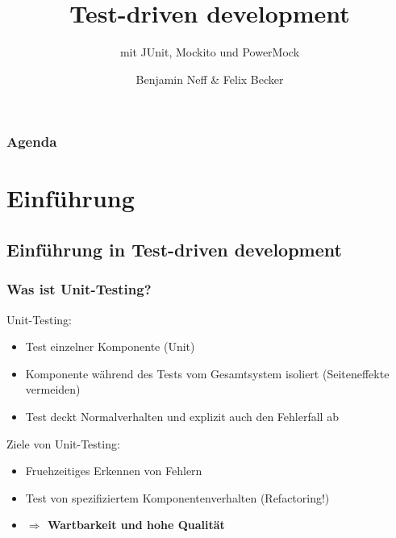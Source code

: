 \documentclass{beamer}
\title{Test-driven development}
\subtitle{mit JUnit, Mockito und PowerMock}
\institute[TD 2k11]{Computerseminar Tondorf 2011}
\author[B. Neff, F. Becker]{
	Benjamin Neff \&
        Felix Becker
}
\begin{document}
	\begin{frame}
		\titlepage
	\end{frame}

	\begin{frame}
		\frametitle{Agenda}
		\setcounter{tocdepth}{1}
		\tableofcontents
	\end{frame}
	

	\logo{}
	\section{Einführung}
	
		\subsection{Einführung in Test-driven development}

			\begin{frame}
				\frametitle{Was ist Unit-Testing?}

				Unit-Testing:
				\begin{itemize}
					\item{Test einzelner Komponente (Unit)}
					\item{Komponente während des Tests vom Gesamtsystem isoliert (Seiteneffekte vermeiden)}
					\item{Test deckt Normalverhalten und explizit auch den Fehlerfall ab}
				\end{itemize}
				\pause
				Ziele von Unit-Testing:
				\begin{itemize}
					\item{Fruehzeitiges Erkennen von Fehlern}
					\item{Test von spezifiziertem Komponentenverhalten (Refactoring!)}
					\item[]{\color{red}\textbf{$\Rightarrow$ Wartbarkeit und hohe Qualität}}
				\end{itemize}
				
			\end{frame}
\end{document}
